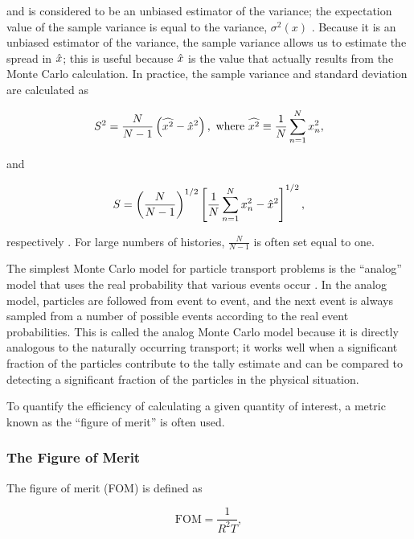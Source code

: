 \noindent and is considered to be an unbiased estimator of the variance; the 
expectation value of the sample variance is equal to the variance, $\sigma^2(x)$ 
\cite{lm}. Because it is an unbiased estimator of the variance, the sample variance
allows us to estimate the spread in $\hat{x}$; this is useful because $\hat{x}$ is the
value that actually results from the Monte Carlo calculation. In practice, the sample
variance and standard deviation are calculated as

\begin{equation}
S^2 = \frac{N}{N-1}\left(\widehat{x^2} - \hat{x}^2\right), \text{ where }
\widehat{x^2} \equiv \frac{1}{N}\sum_{n=1}^{N}x_n^2,
\end{equation}

\noindent and

\begin{equation}
S = \left(\frac{N}{N-1}\right)^{1/2}
\left[\frac{1}{N}\sum_{n=1}^{N}x_n^2 - \hat{x}^2\right]^{1/2},
\end{equation}

\noindent respectively \cite{lm}. For large numbers of histories, $\frac{N}{N-1}$ is 
often set equal to one.

The simplest Monte Carlo model for particle transport problems is the ``analog''
model that uses the real probability that various events occur \cite{mcnp}. In the
analog model, particles are followed from event to event, and the next event is 
always sampled from a number of possible events according to the real event 
probabilities. This is called the analog Monte Carlo model because it is directly 
analogous to the naturally occurring transport; it works well when a significant
fraction of the particles contribute to the tally estimate and can be compared to
detecting a significant fraction of the particles in the physical situation.

To quantify the efficiency of calculating a given quantity of interest, a metric known
as the ``figure of merit'' is often used.

\subsubsection{The Figure of Merit}

The figure of merit (FOM) is defined as

\begin{equation}
\text{FOM} = \frac{1}{R^2T},
\label{eq:fom}
\end{equation}

